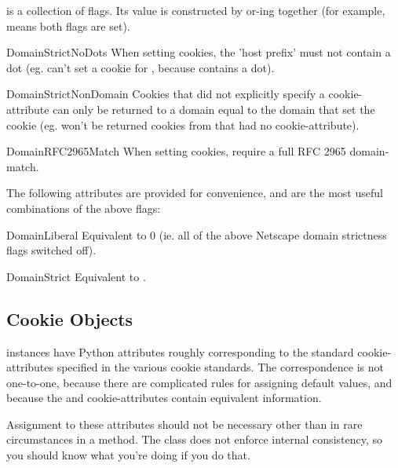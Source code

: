  is a collection of flags.  Its value is
constructed by or-ing together (for example,
 means both flags are
set).

\begin{memberdesc}{DomainStrictNoDots}
When setting cookies, the 'host prefix' must not contain a dot
(eg.  can't set a cookie for ,
because  contains a dot).
\end{memberdesc}
\begin{memberdesc}{DomainStrictNonDomain}
Cookies that did not explicitly specify a 
cookie-attribute can only be returned to a domain equal to the domain
that set the cookie (eg.  won't be returned
cookies from  that had no 
cookie-attribute).
\end{memberdesc}
\begin{memberdesc}{DomainRFC2965Match}
When setting cookies, require a full RFC 2965 domain-match.
\end{memberdesc}

The following attributes are provided for convenience, and are the
most useful combinations of the above flags:

\begin{memberdesc}{DomainLiberal}
Equivalent to 0 (ie. all of the above Netscape domain strictness flags
switched off).
\end{memberdesc}
\begin{memberdesc}{DomainStrict}
Equivalent to .
\end{memberdesc}


\subsection{Cookie Objects \label{cookie-objects}}

 instances have Python attributes roughly corresponding
to the standard cookie-attributes specified in the various cookie
standards.  The correspondence is not one-to-one, because there are
complicated rules for assigning default values, and because the
 and  cookie-attributes contain equivalent
information.

Assignment to these attributes should not be necessary other than in
rare circumstances in a  method.  The class does
not enforce internal consistency, so you should know what you're
doing if you do that.

